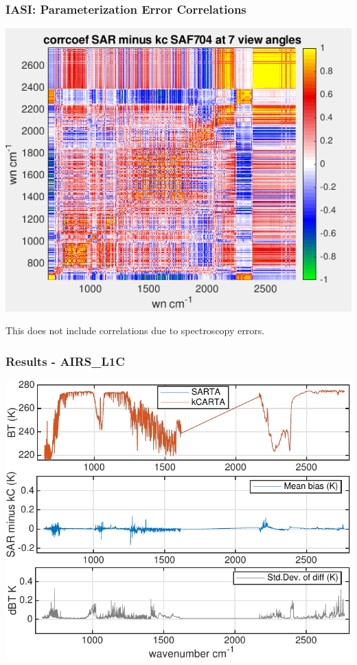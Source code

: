 \documentclass[10pt,t]{beamer}
\begin{document}
\begin{frame}
  \frametitle{IASI:  Parameterization Error Correlations}
  \begin{center}
    \includegraphics[width=0.8\linewidth]{./Figs/Png/plot1.png}
  \end{center}

This does not include correlations due to spectroscopy errors.
  
 \end{frame}

\begin{frame}
  \frametitle{Results - AIRS\_L1C}
  \begin{center}
    \includegraphics[width=0.9\linewidth]{./Figs/Pdf/kc_sar_airs_l1c_mean_bias_stdv_sea_6angs_aslp.pdf}
  \end{center}
      
 \end{frame}
\end{document}
